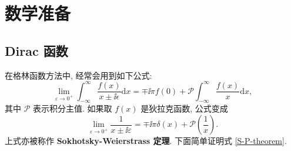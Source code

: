 \chapter{数学准备}
\section{Dirac 函数}
在格林函数方法中, 经常会用到如下公式:
\begin{equation}
    \lim_{\varepsilon\to 0^+}\int_{-\infty}^\infty\frac{f(x)}{x\pm\ii\epsilon}\mathrm{d}x=\mp\ii\pi f(0)+\mathcal{P}\int_{-\infty}^\infty\frac{f(x)}{x}\mathrm{d}x,
\label{S-P-theorem}
\end{equation}
其中 $\mathcal{P}$ 表示积分主值. 如果取 $f(x)$ 是狄拉克函数, 公式变成
\begin{equation}
    \lim_{\varepsilon\to 0^+}\frac{1}{x\pm\ii\varepsilon}=\mp\ii\pi\delta(x)+\mathcal{P}\left( \frac{1}{x}\right).
\end{equation}
上式亦被称作 \textbf{Sokhotsky-Weierstrass 定理}. 下面简单证明式 \eqref{S-P-theorem}.

